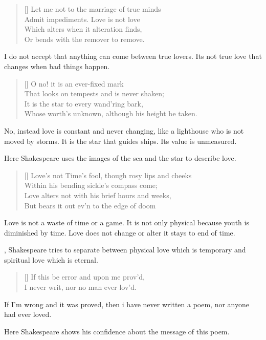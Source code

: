 \documentclass[12pt, a4paper]{article}
\begin{document}
\settowidth{\versewidth}{Let me not to the marriage of true minds}
\begin{verse}[\versewidth]
{\fontverse
Let me not to the marriage of true minds \\
Admit impediments. Love is not love \\
Which alters when it alteration finds,\\ 
Or bends with the remover to remove.
}
\end{verse}
{\fontpar
I do not accept that anything can come between 
true lovers. Its not true love that changes when bad things
happen.
}
\begin{verse}[\versewidth]
{\fontverse
O no! it is an ever-fixed mark\\
That looks on tempests and is never shaken;\\
It is the star to every wand'ring bark,\\
Whose worth's unknown, although his height be taken.
}
\end{verse}
{\fontpar
No, instead love is constant and never changing,
like a lighthouse who is not moved by storms.
It is the star that guides ships. Its value 
is unmeasured.\medbreak

Here Shakespeare uses the images of the sea and the star
to describe love.
}
\begin{verse}[\versewidth]
{\fontverse
Love's not Time's fool, though rosy lips and cheeks\\
Within his bending sickle's compass come; \\
Love alters not with his brief hours and weeks,\\
But bears it out ev'n to the edge of doom
}
\end{verse}
{\fontpar
Love is not a waste of time or a game. It is not only physical
because youth is diminished by time. Love does not change or alter
it stays to end of time.\medbreak

, Shakespeare tries to separate between physical
love which is temporary and spiritual love which is eternal.
}
\begin{verse}[\versewidth]
{\fontverse
If this be error and upon me prov'd,\\
I never writ, nor no man ever lov'd.
}
\end{verse}
{\fontpar
If I'm wrong and it was proved, then i have 
never written a poem, nor anyone had ever loved.\medbreak

Here Shakespeare shows his confidence about the message of this 
poem.
}
\end{document}
